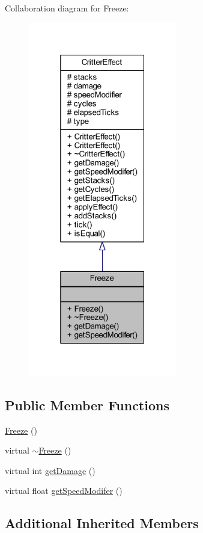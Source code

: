 Collaboration diagram for Freeze\+:
\nopagebreak
\begin{figure}[H]
\begin{center}
\leavevmode
\includegraphics[width=184pt]{struct_freeze__coll__graph}
\end{center}
\end{figure}
\subsection*{Public Member Functions}
\begin{DoxyCompactItemize}
\item 
\hyperlink{struct_freeze_a839e6306b8df0bad3b9b075e693c6839}{Freeze} ()
\item 
virtual \hyperlink{struct_freeze_ad6ed341963440e0c02e9f37d5115a2de}{$\sim$\+Freeze} ()
\item 
virtual int \hyperlink{struct_freeze_a5f9b77d2b88bb5f945d476f4405569a3}{get\+Damage} ()
\item 
virtual float \hyperlink{struct_freeze_a47d5a9d0658cd1e8d25e174dca0b934b}{get\+Speed\+Modifer} ()
\end{DoxyCompactItemize}
\subsection*{Additional Inherited Members}


